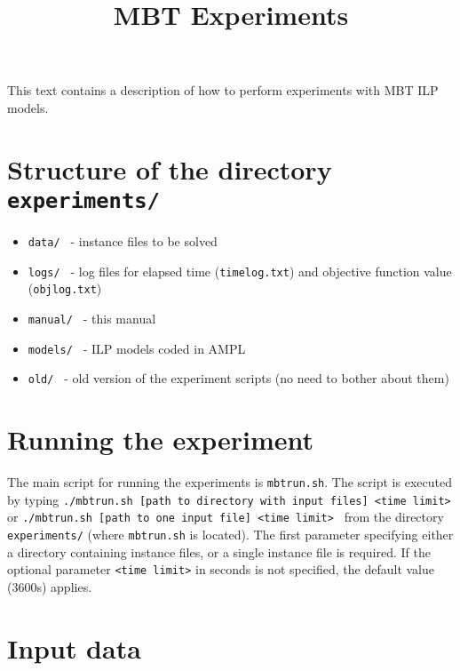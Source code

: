 \documentclass[12pt]{article}
\title{MBT Experiments}
\begin{document}
\maketitle
This text contains a description of how to perform experiments with MBT ILP models.

\section{Structure of the directory \texttt{experiments/}}
\begin{itemize}
	\item\texttt{data/ } - instance files to be solved
	\item\texttt{logs/ } - log files for elapsed time (\texttt{timelog.txt}) and objective function value (\texttt{objlog.txt})
	\item\texttt{manual/ } - this manual
	\item\texttt{models/ } - ILP models coded in AMPL
	\item\texttt{old/ } - old version of the experiment scripts (no need to bother about them)
\end{itemize}

\section{Running the experiment}

The main script for running the experiments is \texttt{mbtrun.sh}.
The script is executed by typing \newline\newline
\texttt{./mbtrun.sh [path to directory with input files] <time limit> }\newline\newline
or\newline\newline 
\texttt{./mbtrun.sh [path to one input file] <time limit> }\newline\newline
from the directory \texttt{experiments/} (where \texttt{mbtrun.sh} is located).
The first parameter specifying either a directory containing instance files, or a single instance file is required.
If the optional parameter \texttt{<time limit>} in seconds is not specified, the default value (3600s) applies.

\section{Input data}
\end{document}
